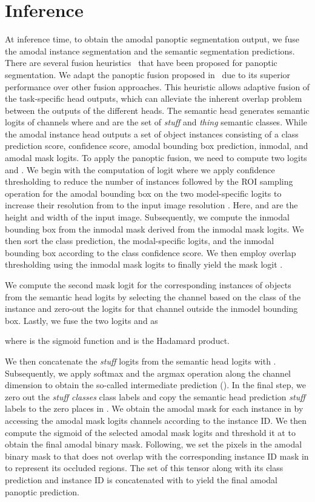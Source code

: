 \documentclass[10pt,twocolumn,letterpaper]{article}
\begin{document}
\section{Inference}
\label{sec:supp_inference}

At inference time, to obtain the amodal panoptic segmentation output, we fuse the amodal instance segmentation and the semantic segmentation predictions. There are several fusion heuristics~\cite{kirillov2019panoptic, xiong2019upsnet, mohan2020efficientps} that have been proposed for panoptic segmentation. We adapt the panoptic fusion proposed in~\cite{mohan2020efficientps} due to its superior performance over other fusion approaches. This heuristic allows adaptive fusion of the task-specific head outputs, which can alleviate the inherent overlap problem between the outputs of the different heads. The semantic head generates semantic logits of  channels where  and  are the set of \textit{stuff} and \textit{thing} semantic classes. While the amodal instance head outputs a set of object instances consisting of a class prediction score, confidence score, amodal bounding box prediction, inmodal, and amodal mask logits. To apply the panoptic fusion, we need to compute two logits  and . We begin with the computation of logit  where we apply confidence thresholding to reduce the number of instances followed by the ROI sampling operation for the amodal bounding box on the two model-specific logits to increase their resolution from  to the input image resolution . Here,  and  are the height and width of the input image. Subsequently, we compute the inmodal bounding box from the inmodal mask derived from the inmodal mask logits. We then sort the class prediction, the modal-specific logits, and the inmodal bounding box according to the class confidence score. We then employ overlap thresholding using the inmodal mask logits to finally yield the mask logit .

We compute the second mask logit  for the corresponding instances of objects from the semantic head logits by selecting the channel based on the class of the instance and zero-out the logits for that channel outside the inmodel bounding box. Lastly, we fuse the two logits  and  as

where  is the sigmoid function and  is the Hadamard product.

We then concatenate the \textit{stuff} logits from the semantic head logits with . Subsequently, we apply softmax and the argmax operation along the channel dimension to obtain the so-called intermediate prediction (). In the final step, we zero out the \textit{stuff classes} class labels and copy the semantic head prediction \textit{stuff} labels to the zero places in .  We obtain the amodal mask for each instance in  by accessing the amodal mask logits channels according to the instance ID. We then compute the sigmoid of the selected amodal mask logits and threshold it at  to obtain the final amodal binary mask. Following, we set the pixels in the amodal binary mask to  that does not overlap with the corresponding instance ID mask in  to represent its occluded regions. The set of this tensor along with its class prediction and instance ID is concatenated with  to yield the final amodal panoptic prediction.
\end{document}
